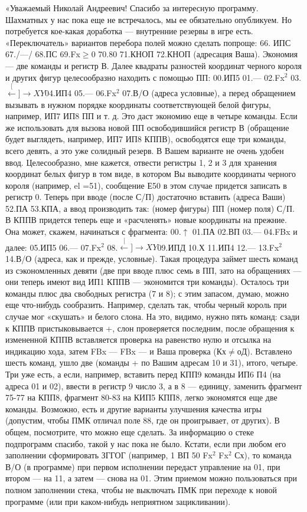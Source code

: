 \documentclass[11pt,a4paper,oneside]{article}
\def\XY{$\stackrel[\leftarrow]{\rightarrow}{XY}$}
\begin{document}
«Уважаемый Николай Андреевич! Спасибо за интересную программу. Шахматных у нас пока еще не встречалось, мы ее обязательно опубликуем. Но потребуется кое-какая доработка — внутренние резервы в игре есть. «Переключатель» вариантов перебора полей можно сделать попроще: 66. ИПС 67./—/ 68.ПС 69.Fx$\geq$0 70.80 71.КНОП 72.КНОП (адресация Ваша). Экономия — две команды и регистр В. Далее квадраты разностей координат черного короля и других фигур целесообразно находить с помощью ПП: 00.ИП5 01.— 02.Fx$^{2}$ 03.\XY 04.ИП4 05.— 06.Fx$^{2}$ 07.В/О (адреса условные), а перед обращением вызывать в нужном порядке координаты соответствующей белой фигуры, например, ИП7 ИП8 ПП и т. д. Это даст экономию еще в четыре команды. Если же использовать для вызова новой ПП освободившийся регистр В (обращение будет выглядеть, например, ИП7 ИП8 КППВ), освободятся еще три команды, всего девять, а это уже солидный резерв. В Вашем варианте не очень удобен ввод. Целесообразно, мне кажется, отвести регистры 1, 2 и 3 для хранения координат белых фигур в том виде, в котором Вы выводите координаты черного короля (например, el =51), сообщение Е50 в этом случае придется записать в регистр 0. Теперь при вводе (после С/П) достаточно вставить (адреса Ваши) 52.ПА 53.КПА, а ввод производить так: (номер фигуры) ПП (номер поля) С/П. В КППВ придется теперь еще и «расчленять» новые координаты на прежние. Она может, скажем, начинаться с фрагмента: 00.$\uparrow$ 01.ПА 02.ВП 03.— 04.FBx и далее: 05.ИП5 06.— 07.Fx$^{2}$ 08.\XY 09.ИПД 10.Х	11.ИП4 12.— 13.Fx$^{2}$ 14.В/О (адреса, как и прежде, условные). Такая процедура займет шесть команд из сэкономленных девяти (две при вводе плюс семь в ПП, зато на обращениях — они теперь имеют вид ИП1 КППВ — экономится три команды). Осталось три команды плюс два свободных регистра (7 и 8); с этим запасом, думаю, можно еще что-нибудь сообразить. Например, сделать так, чтобы черный король при случае мог «скушать» и белого слона. На это, видимо, нужно пять команд: сзади к КППВ пристыковывается +, слон проверяется последним, после обращения к измененной КППВ вставляется проверка на равенство нулю и отсылка на индикацию хода, затем FBx — FBx — и Ваша проверка (Кх$\neq$оД). Вставлено шесть команд, ушло две (команды + по Вашим адресам 10 и 31), итого, четыре. Три уже есть, а если, например, вставить перед КПП9 команды ИП6 П4 (на адреса 01 и 02), ввести в регистр 9 число 3, а в 8 — единицу, заменить фрагмент 75-77 на КПП8, фрагмент 80-83 на КИП5 КПП8, легко экономятся еще две команды. Возможно, есть и другие варианты улучшения качества игры (допустим, чтобы ПМК отличал поле 88, где он проигрывает, от других). В общем, посмотрите, что можно еще сделать. За информацию о стеке подпрограмм спасибо, такой у нас пока не было. Кстати, если при любом его заполнении сформировать ЗГГОГ (например, 1 ВП 50 Fx$^{2}$ Fx$^{2}$ Сх), то команда В/О (в программе) при первом исполнении передаст управление на 01, при втором — на 11, а затем — снова на 01. Этим приемом можно пользоваться при полном заполнении стека, чтобы не выключать ПМК при переходе к новой программе (или при каком-нибудь неприятном зацикливании).
\end{document}
